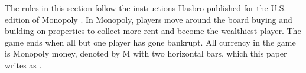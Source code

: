 



The rules in this section follow the instructions Hasbro published for the U.S. edition of Monopoly \citep{hasbro_monopoly_rules}.
In Monopoly, players move around the board buying and building on properties to collect more rent and become the wealthiest player. The game ends when all but one player has gone bankrupt. All currency in the game is Monopoly money, denoted by M with two horizontal bars, which this paper writes as \citep{fields2016monopoly}.

